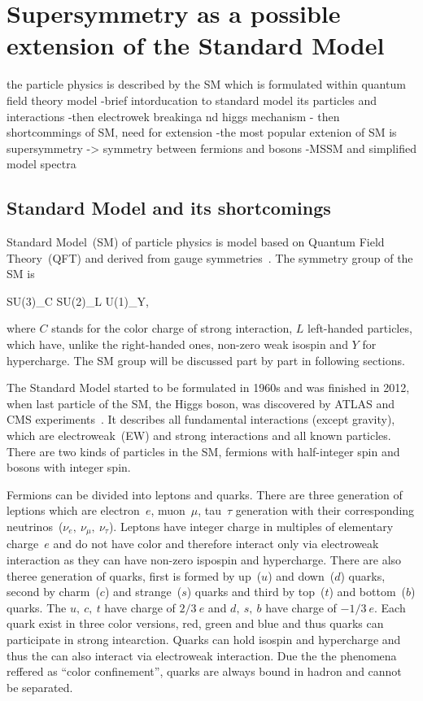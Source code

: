 \chapter{Supersymmetry as a possible extension of the Standard Model}

the particle physics is described by the SM which is formulated within quantum field theory model
-brief intorducation to standard model its particles and interactions
-then electrowek breakinga nd higgs mechanism
- then shortcommings of SM, need for extension
-the most popular extenion of SM is supersymmetry -> symmetry between fermions and bosons
-MSSM and simplified model spectra

\section{Standard Model and its shortcomings}

Standard Model~(SM) of particle physics is model based on Quantum Field Theory~(QFT) and derived from gauge symmetries~\cite{9783527406012}. The symmetry group of the SM is

{
SU(3)_{C} \otimes SU(2)_{L} \otimes U(1)_{Y},
}

where $C$ stands for the color charge of strong interaction, $L$ left-handed particles, which have, unlike the right-handed ones, non-zero weak isospin and $Y$ for hypercharge. The SM group will be discussed part by part in following sections.

The Standard Model started to be formulated in 1960s and was finished in 2012, when last particle of the SM, the Higgs boson, was discovered by ATLAS and CMS experiments~\cite{Chatrchyan:2012xdj, Aad:2012tfa}. It describes all fundamental interactions (except gravity), which are electroweak~(EW) and strong interactions and all known particles. There are two kinds of particles in the SM, fermions with half-integer spin and bosons with integer spin.

Fermions can be divided into leptons and quarks. There are three generation of leptions which are electron~$e$, muon~$\mu$, tau~$\tau$ generation with their corresponding neutrinos~($\nu_{e},~\nu_{\mu},~\nu_{\tau}$). Leptons have integer charge in multiples of elementary charge~$e$ and do not have color and therefore interact only via electroweak interaction as they can have non-zero ispospin and hypercharge. There are also theree generation of quarks, first is formed by up~($u$) and down~($d$) quarks, second by charm~($c$) and strange~($s$) quarks and third by top~($t$) and bottom~($b$) quarks. The $u,~c,~t$ have charge of $2/3~e$ and $d,~s,~b$ have charge of $-1/3~e$. Each quark exist in three color versions, red, green and blue and thus quarks can participate in strong intearction. Quarks can hold isospin and hypercharge and thus the can also interact via electroweak interaction. Due the the phenomena reffered as ``color confinement'', quarks are always bound in hadron and cannot be separated.


